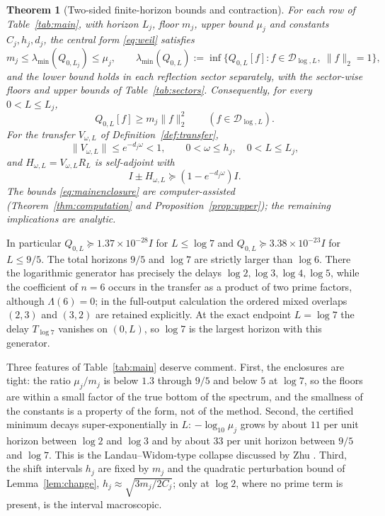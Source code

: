 \documentclass[11pt]{article}
\numberwithin{equation}{section}
\newtheorem{theorem}{Theorem}[section]
\theoremstyle{definition}
\theoremstyle{remark}
\newcommand{\DD}{\mathcal D}
\newcommand{\norm}[1]{\lVert#1\rVert}
\begin{document}
\begin{theorem}[Two-sided finite-horizon bounds and contraction]\label{thm:main}
For each row of Table~\ref{tab:main}, with horizon $L_j$, floor $m_j$, upper
bound $\mu_j$ and constants $C_j,h_j,d_j$, the central form \eqref{eq:weil}
satisfies
\begin{equation}\label{eq:mainenclosure}
 m_j\le\lambda_{\min}(Q_{0,L_j})\le\mu_j,\qquad
 \lambda_{\min}(Q_{0,L}):=\inf\{Q_{0,L}[f]:f\in\DD_{\log,L},\ \norm f_2=1\},
\end{equation}
and the lower bound holds in each reflection sector separately, with the
sector-wise floors and upper bounds of Table~\ref{tab:sectors}. Consequently,
for every $0<L\le L_j$,
\begin{equation}\label{eq:maincentral}
 Q_{0,L}[f]\ge m_j\norm f_2^2\qquad(f\in\DD_{\log,L}).
\end{equation}
For the transfer $V_{\omega,L}$ of Definition~\ref{def:transfer},
\begin{equation}\label{eq:maintransfer}
 \norm{V_{\omega,L}}\le e^{-d_j\omega}<1,
 \qquad 0<\omega\le h_j,\quad 0<L\le L_j,
\end{equation}
and $H_{\omega,L}=V_{\omega,L}R_L$ is self-adjoint with
\begin{equation}\label{eq:mainreflection}
 I\pm H_{\omega,L}\succeq(1-e^{-d_j\omega})I.
\end{equation}
The bounds \eqref{eq:mainenclosure} are computer-assisted
(Theorem~\ref{thm:computation} and Proposition~\ref{prop:upper}); the
remaining implications are analytic.
\end{theorem}



In particular $Q_{0,L}\succeq1.37\times10^{-28}I$ for $L\le\log7$ and
$Q_{0,L}\succeq3.38\times10^{-23}I$ for $L\le9/5$. The total horizons $9/5$
and $\log7$ are strictly larger than $\log6$. There the logarithmic generator
has precisely the delays $\log2,\log3,\log4,\log5$, while the coefficient of
$n=6$ occurs in the transfer as a product of two prime factors, although
$\Lambda(6)=0$; in the full-output calculation the ordered mixed overlaps
$(2,3)$ and $(3,2)$ are retained explicitly. At the exact endpoint $L=\log7$
the delay $T_{\log7}$ vanishes on $(0,L)$, so $\log7$ is the largest horizon
with this generator.

Three features of Table~\ref{tab:main} deserve comment. First, the enclosures
are tight: the ratio $\mu_j/m_j$ is below $1.3$ through $9/5$ and below $5$ at
$\log7$, so the floors are within a small factor of the true bottom of the
spectrum, and the smallness of the constants is a property of the form, not of
the method. Second, the certified minimum decays super-exponentially in $L$:
$-\log_{10}\mu_j$ grows by about $11$ per unit horizon between $\log2$ and
$\log3$ and by about $33$ per unit horizon between $9/5$ and $\log7$. This is
the Landau--Widom-type collapse discussed by Zhu \cite{Zhu2026}. Third, the
shift intervals $h_j$ are fixed by $m_j$ and the quadratic perturbation bound
of Lemma~\ref{lem:change}, $h_j\approx\sqrt{3m_j/2C_j}$; only at $\log2$,
where no prime term is present, is the interval macroscopic.
\end{document}
